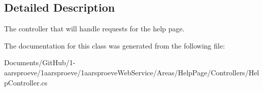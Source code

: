\subsection{Detailed Description}
The controller that will handle requests for the help page. 



The documentation for this class was generated from the following file\+:\begin{DoxyCompactItemize}
\item 
Documents/\+Git\+Hub/1-\/aarsproeve/1aarsproeve/1aarsproeve\+Web\+Service/\+Areas/\+Help\+Page/\+Controllers/Help\+Controller.\+cs\end{DoxyCompactItemize}

